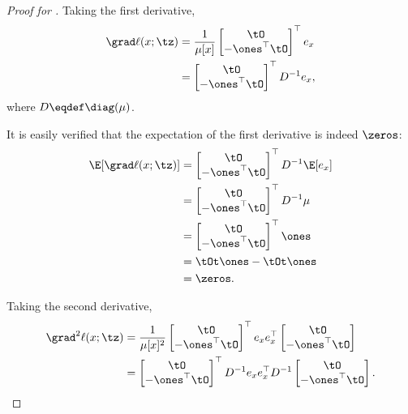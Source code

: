 \begin{proof}[Proof for ]
Taking the first derivative,
\begin{align}
  \grad \ell(x; \tz)
  &= 
  \frac{
  1}{\mu[x]}
  \begin{bmatrix}
    \tO \\
    -\ones^\top \tO
  \end{bmatrix}^\top
 e_x \nonumber \\
  &= 
  \begin{bmatrix}
    \tO \\
    -\ones^\top \tO
  \end{bmatrix}^\top
  D^{-1} e_x, \label{eqn:lhood-grad}
\end{align}
where $D \eqdef \diag(\mu)$.

It is easily verified that the expectation of the first derivative is indeed $\zeros$:
\begin{align*}
  \E[\grad \ell(x; \tz)]
  &= 
  \begin{bmatrix}
    \tO \\
    -\ones^\top \tO
  \end{bmatrix}^\top
  D^{-1} \E[e_x] \\
  &= 
  \begin{bmatrix}
    \tO \\
    -\ones^\top \tO
  \end{bmatrix}^\top
  D^{-1} \mu \\
  &= 
  \begin{bmatrix}
    \tO \\
    -\ones^\top \tO
  \end{bmatrix}^\top
  \ones \\
  &= \tOt\ones - \tOt\ones \\
  &= \zeros.
\end{align*}

Taking the second derivative,
\begin{align}
  \grad^2 \ell(x; \tz)
  &= 
  \frac{
  1}{\mu[x]^2}
  \begin{bmatrix}
    \tO \\
    -\ones^\top \tO
  \end{bmatrix}^\top
 e_x e_x^\top 
  \begin{bmatrix}
    \tO \\
    -\ones^\top \tO
  \end{bmatrix}
  \nonumber
 \\ 
  &= 
  \begin{bmatrix}
    \tO \\
    -\ones^\top \tO
  \end{bmatrix}^\top
    D^{-1} e_x e_x^\top D^{-1} 
  \begin{bmatrix}
    \tO \\
    -\ones^\top \tO
  \end{bmatrix}. \label{eqn:lhood-hess}%
\end{align}


\end{proof}
